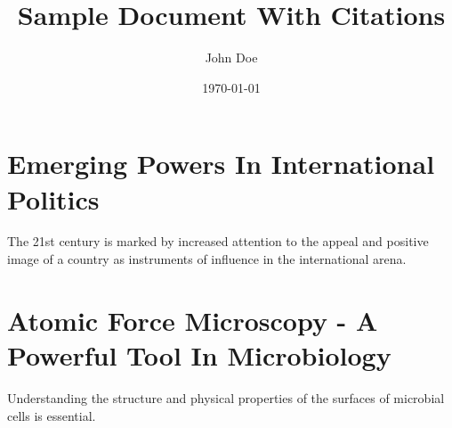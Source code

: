 \documentclass[a4paper]{article}
\title{\textbf{Sample Document With Citations}}
\author{John Doe}
\date{\today}
\begin{document}
    \maketitle
    
    \section{Emerging Powers In International Politics}
    The 21st century is marked by increased attention to the appeal and positive image of a country as instruments of influence in the international arena. \cite{kosachev2012spsecific} 

    \section{Atomic Force Microscopy - A Powerful Tool In Microbiology}
    Understanding the structure and physical properties of the surfaces of microbial cells is essential. \cite{dufrene2002atomic}
    
    
    
\end{document}
